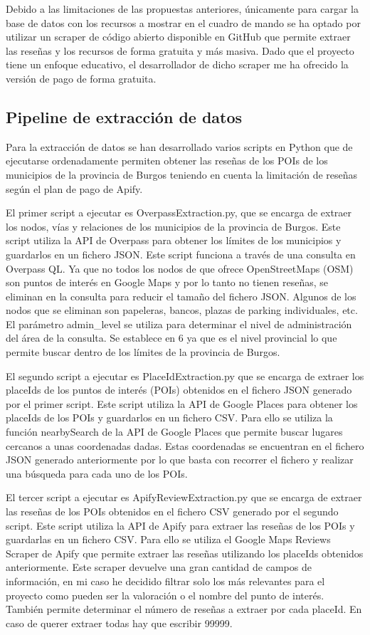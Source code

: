 Debido a las limitaciones de las propuestas anteriores, únicamente para cargar la base de datos con los recursos a mostrar en el cuadro de mando se ha optado por utilizar un scraper de código abierto disponible en GitHub\cite{scraper} que permite extraer las reseñas y los recursos de forma gratuita y más masiva.
Dado que el proyecto tiene un enfoque educativo, el desarrollador de dicho scraper me ha ofrecido la versión de pago de forma gratuita.

\subsection{Pipeline de extracción de datos}

Para la extracción de datos se han desarrollado varios scripts en Python que de ejecutarse ordenadamente permiten obtener las reseñas de los POIs de los municipios de la provincia de Burgos teniendo en cuenta la limitación de reseñas según el plan de pago de Apify.

El primer script a ejecutar es OverpassExtraction.py, que se encarga de extraer los nodos, vías y relaciones de los municipios de la provincia de Burgos. 
Este script utiliza la API de Overpass para obtener los límites de los municipios y guardarlos en un fichero JSON.
Este script funciona a través de una consulta en Overpass QL. Ya que no todos los nodos de que ofrece OpenStreetMaps (OSM) son puntos de interés en Google Maps y por lo tanto no tienen reseñas, se eliminan en la consulta para reducir el tamaño del fichero JSON.
Algunos de los nodos que se eliminan son papeleras, bancos, plazas de parking individuales, etc.
El parámetro admin\_level se utiliza para determinar el nivel de administración del área de la consulta. Se establece en 6 ya que es el nivel provincial lo que permite buscar dentro de los límites de la provincia de Burgos.

El segundo script a ejecutar es PlaceIdExtraction.py que se encarga de extraer los placeIds de los puntos de interés (POIs) obtenidos en el fichero JSON generado por el primer script.
Este script utiliza la API de Google Places para obtener los placeIds de los POIs y guardarlos en un fichero CSV.
Para ello se utiliza la función nearbySearch de la API de Google Places que permite buscar lugares cercanos a unas coordenadas dadas. Estas coordenadas se encuentran en el fichero JSON generado anteriormente por lo que basta 
con recorrer el fichero y realizar una búsqueda para cada uno de los POIs.

El tercer script a ejecutar es ApifyReviewExtraction.py que se encarga de extraer las reseñas de los POIs obtenidos en el fichero CSV generado por el segundo script.
Este script utiliza la API de Apify para extraer las reseñas de los POIs y guardarlas en un fichero CSV.
Para ello se utiliza el Google Maps Reviews Scraper de Apify que permite extraer las reseñas utilizando los placeIds obtenidos anteriormente.
Este scraper devuelve una gran cantidad de campos de información, en mi caso he decidido filtrar solo los más relevantes para el proyecto como pueden ser la valoración o el nombre del punto de interés.
También permite determinar el número de reseñas a extraer por cada placeId. En caso de querer extraer todas hay que escribir 99999.

